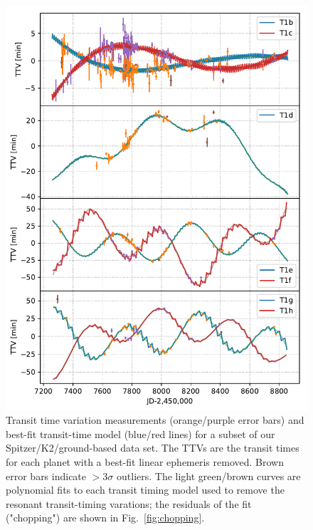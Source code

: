 \documentclass[fleqn,usenatbib]{mnras} %
\begin{document}
\begin{figure}
	\includegraphics[width=0.95\hsize]{figures/T1_ttvs_4panel_stacked.pdf}
    \caption{Transit time variation measurements (orange/purple error bars) and best-fit
    transit-time model (blue/red lines) for a subset of our
    Spitzer/K2/ground-based data set.  The TTVs are the transit times for each planet 
    with a best-fit linear ephemeris removed.  Brown error bars indicate $>3\sigma$ outliers.  The light green/brown curves are polynomial fits
    to each transit timing model used to remove the resonant transit-timing varations;  the residuals
    of the fit ("chopping") are shown in Fig.\ \ref{fig:chopping}.}
    \label{fig:T1_TTVs}
\end{figure}
\end{document}
